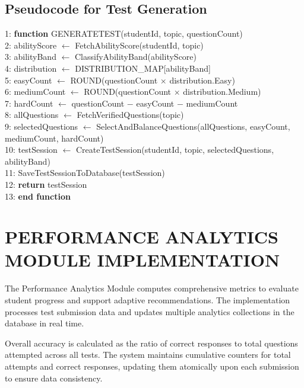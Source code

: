 \begin{sloppypar}
\subsection{Pseudocode for Test Generation}

1: \textbf{function} GENERATETEST(studentId, topic, questionCount)\\
2: \quad abilityScore $\leftarrow$ FetchAbilityScore(studentId, topic)\\
3: \quad abilityBand $\leftarrow$ ClassifyAbilityBand(abilityScore)\\
4: \quad distribution $\leftarrow$ DISTRIBUTION\_MAP[abilityBand]\\
5: \quad easyCount $\leftarrow$ ROUND(questionCount $\times$ distribution.Easy)\\
6: \quad mediumCount $\leftarrow$ ROUND(questionCount $\times$ distribution.Medium)\\
7: \quad hardCount $\leftarrow$ questionCount $-$ easyCount $-$ mediumCount\\
8: \quad allQuestions $\leftarrow$ FetchVerifiedQuestions(topic)\\
9: \quad selectedQuestions $\leftarrow$ SelectAndBalanceQuestions(allQuestions, easyCount, mediumCount, hardCount)\\
10: \quad testSession $\leftarrow$ CreateTestSession(studentId, topic, selectedQuestions, abilityBand)\\
11: \quad SaveTestSessionToDatabase(testSession)\\
12: \quad \textbf{return} testSession\\
13: \textbf{end function}
\algofooter

\section{\MakeUppercase{PERFORMANCE ANALYTICS MODULE IMPLEMENTATION}}

The Performance Analytics Module computes comprehensive metrics to evaluate student progress and support adaptive recommendations. The implementation processes test submission data and updates multiple analytics collections in the database in real time.

Overall accuracy is calculated as the ratio of correct responses to total questions attempted across all tests. The system maintains cumulative counters for total attempts and correct responses, updating them atomically upon each submission to ensure data consistency.


\end{sloppypar}
